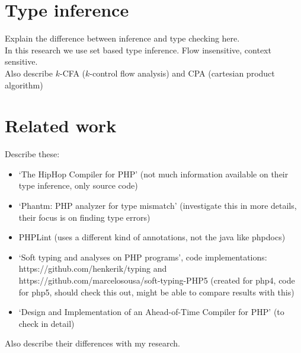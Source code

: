 \documentclass[../main.tex]{subfiles}
\begin{document}
    \section{Type inference}
    Explain the difference between inference and type checking here.
    \\
    In this research we use set based type inference.
    Flow insensitive, context sensitive.
    \\
    Also describe $k$-CFA ($k$-control flow analysis) and CPA (cartesian product algorithm)
    
    
    
    \section{Related work}
    Describe these:
    \begin{itemize}
        \item `The HipHop Compiler for PHP'\cite{Zhao:12} (not much information available on their type inference, only source code)
        \item `Phantm: PHP analyzer for type mismatch'\cite{Kne:10,Bar:10} (investigate this in more details, their focus is on finding type errors)
        \item PHPLint \footnotemark (uses a different kind of annotations, not the java like phpdocs)
        \item `Soft typing and analyses on PHP programs'\cite{}, code implementations: https://github.com/henkerik/typing and https://github.com/marcelosousa/soft-typing-PHP5 (created for php4, code for php5, should check this out, might be able to compare results with this)
        \item `Design and Implementation of an Ahead-of-Time Compiler for PHP'\cite{Big:10} (to check in detail)
    \end{itemize}
    Also describe their differences with my research.
    
\end{document}
